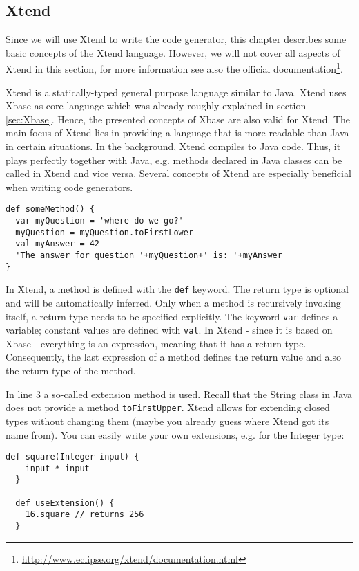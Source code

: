 \subsection{Xtend}
 
Since we will use Xtend to write the code generator, this chapter describes some
basic concepts of the Xtend language. However, we will not cover all aspects of
Xtend in this section, for more information see also the official documentation\footnote{\url{http://www.eclipse.org/xtend/documentation.html}}.

Xtend is a statically-typed general purpose language similar to Java. Xtend uses
Xbase as core language which was already roughly explained in section \ref{sec:Xbase}.
Hence, the presented concepts of Xbase are also valid for Xtend. The main focus
of Xtend lies in providing a language that is more readable than Java in certain
situations. In the background, Xtend compiles to Java code. Thus, it plays
perfectly together with Java, e.g. methods declared in Java classes can be called in Xtend
and vice versa. Several concepts of Xtend are especially beneficial when writing code
generators. 

\begin{lstlisting}[language=Xtend]
def someMethod() {
  var myQuestion = 'where do we go?'
  myQuestion = myQuestion.toFirstLower
  val myAnswer = 42
  'The answer for question '+myQuestion+' is: '+myAnswer
}
\end{lstlisting}

In Xtend, a method is defined with the \texttt{def} keyword. The return type is
optional and will be automatically inferred. Only when a method is recursively
invoking itself, a return type needs to be specified explicitly. The keyword 
\texttt{var} defines a variable; constant values are defined with \texttt{val}.
In Xtend - since it is based on Xbase - everything is an expression, meaning that 
it has a return type. Consequently, the last expression of a method defines the
return value and also the return type of the method.

In line 3 a so-called extension method is used. Recall that the String class in 
Java does not provide a method \texttt{toFirstUpper}. Xtend allows for extending
closed types without changing them (maybe you already guess where Xtend got its
name from).
You can easily write your own extensions, e.g. for the Integer type:

\begin{lstlisting}[language=Xtend]
  def square(Integer input) {
  	input * input
  }
  
  def useExtension() {
  	16.square // returns 256
  }
\end{lstlisting}

